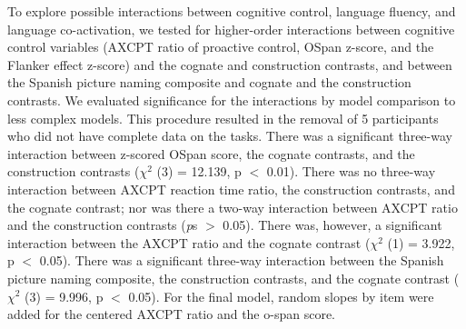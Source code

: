 To explore possible interactions between cognitive control, language fluency, and language co-activation, we tested for higher-order interactions between cognitive control variables (AXCPT ratio of proactive control, OSpan z-score, and the Flanker effect z-score) and the cognate and construction contrasts, and between the Spanish picture naming composite and cognate and the construction contrasts. We evaluated significance for the interactions by model comparison to less complex models. This procedure resulted in the removal of 5 participants who did not have complete data on the tasks. There was a significant three-way interaction between z-scored OSpan score, the cognate contrasts, and the construction contrasts ($\chi^2$ (3) = 12.139, p $<$ 0.01). There was no three-way interaction between AXCPT reaction time ratio, the construction contrasts, and the cognate contrast; nor was there a two-way interaction between AXCPT ratio and the construction contrasts (\emph{p}s $>$ 0.05). There was, however, a significant interaction between the AXCPT ratio and the cognate contrast ($\chi^2$ (1) = 3.922, p $<$ 0.05). There was a significant three-way interaction between the Spanish picture naming composite, the construction contrasts, and the cognate contrast ($\chi^2$ (3) = 9.996, p $<$ 0.05). For the final model, random slopes by item were added for the centered AXCPT ratio and the o-span score.

